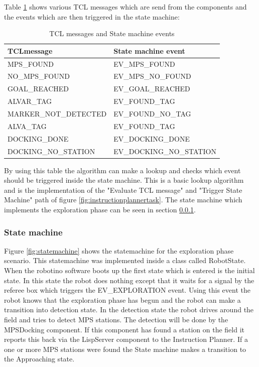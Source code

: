 Table \ref{tab:tcl_state} shows various TCL messages which are send from the components and the events which are then triggered in the state machine: \\

\begin {table}[h]
\caption{TCL messages and State machine events}
\label{tab:tcl_state}
\begin{center}

\begin{tabular}{|l|l|}
\hline 
TCLmessage & State machine event \\ 
\hline 
MPS\_FOUND & EV\_MPS\_FOUND \\ 
\hline 
NO\_MPS\_FOUND & EV\_MPS\_NO\_FOUND \\ 
\hline 
GOAL\_REACHED & EV\_GOAL\_REACHED\\ 
\hline 
ALVAR\_TAG & EV\_FOUND\_TAG \\ 
\hline 
MARKER\_NOT\_DETECTED & EV\_FOUND\_NO\_TAG \\ 
\hline 
ALVA\_TAG & EV\_FOUND\_TAG \\ 
\hline 
DOCKING\_DONE & EV\_DOCKING\_DONE \\ 
\hline 
DOCKING\_NO\_STATION & EV\_DOCKING\_NO\_STATION \\ 
\hline 
\end{tabular} 
\end{center}
\end {table}

\bigskip

By using this table the algorithm can make a lookup and checks which event should be triggered inside the state machine. This is a basic lookup algorithm and is the implementation of the "Evaluate TCL message" and "Trigger State Machine" path of figure \ref{fig:instructionplannertask}. The state machine which implements the exploration phase can be seen in section \ref{sec:state_machine}. 
  

\subsubsection{State machine}
\label{sec:state_machine}

Figure \ref{fig:statemachine} shows the statemachine for the exploration phase scenario. This statemachine was implemented inside a class called RobotState. When the robotino software boots up the first state which is entered is the initial state. In this state the robot does nothing except that it waits for a signal by the referee box which triggers the EV\_EXPLORATION event. Using this event the robot knows that the exploration phase has begun and the robot can make a transition into detection state. In the detection state the robot drives around the field and tries to detect MPS stations. The detection will be done by the MPSDocking component. If this component has found a station on the field it reports this back via the LispServer component to the Instruction Planner. If a one or more MPS stations were found the State machine makes a transition to the Approaching state. \\


